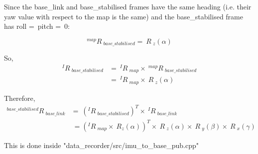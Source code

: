 \documentclass{article}
\begin{document}
Since the base\_link and base\_stabilised frames have the same heading (i.e. their yaw value with respect to the map is the same) and the base\_stabilised frame has roll =\ pitch =\ 0:

\begin{equation}
^{map}R\ _{base\_stabilised} =\ R\ _z(\alpha) 
\end{equation}

So,
\begin{align}
^{I}R\ _{base\_stabilised} & =\ ^{I}R\ _{map} \times\  ^{map}R\ _{base\_stabilised}\\
 & =\ ^{I}R\ _{map} \times\  R\ _z(\alpha) 
\end{align}

Therefore,
\begin{align}
^{base\_stabilised}R\ _{base\_link} &=\ (^{I}R\ _{base\_stabilised})^T \times\  ^{I}R\ _{base\_link}\\
 &\ = (^{I}R\ _{map} \times\  R_z(\alpha))^T \times\  R\ _z(\alpha) \times\  R\ _y(\beta) \times\  R\ _x(\gamma) 
\end{align}

This is done inside "data\_recorder/src/imu\_to\_base\_pub.cpp"
\end{document}
